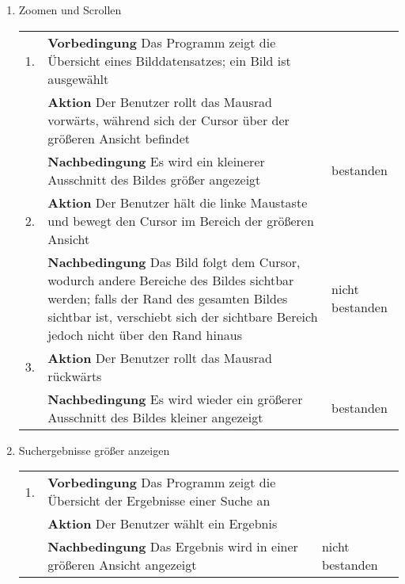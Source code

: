\begin{enumerate} [label=\bfseries /TSW \arabic*0/, leftmargin=*]
	\item Zoomen und Scrollen \label{ts:zoom_scroll} \newline \newline
	\begin{tabular}{rp{4in}|l}
	1. & \textbf{Vorbedingung} Das Programm zeigt die Übersicht eines Bilddatensatzes; ein Bild ist ausgewählt & \\
	   & \textbf{Aktion} Der Benutzer rollt das Mausrad vorwärts, während sich der Cursor über der größeren Ansicht befindet & \\
	   & \textbf{Nachbedingung} Es wird ein kleinerer Ausschnitt des Bildes größer angezeigt & bestanden \\
	\hline
	2. & \textbf{Aktion} Der Benutzer hält die linke Maustaste und bewegt den Cursor im Bereich der größeren Ansicht & \\
	   & \textbf{Nachbedingung} Das Bild folgt dem Cursor, wodurch andere Bereiche des Bildes sichtbar werden; falls der Rand des gesamten Bildes sichtbar ist, verschiebt sich der sichtbare Bereich jedoch nicht über den Rand hinaus & nicht bestanden \\
	\hline
	3. & \textbf{Aktion} Der Benutzer rollt das Mausrad rückwärts & \\
	   & \textbf{Nachbedingung} Es wird wieder ein größerer Ausschnitt des Bildes kleiner angezeigt & bestanden \\
	\end{tabular}
	\newline

	\item Suchergebnisse größer anzeigen \label{ts:groesseres_suchergebnis} \newline \newline
	\begin{tabular}{rp{4in}|l}
	1. & \textbf{Vorbedingung} Das Programm zeigt die Übersicht der Ergebnisse einer Suche an & \\
	   & \textbf{Aktion} Der Benutzer wählt ein Ergebnis & \\
	   & \textbf{Nachbedingung} Das Ergebnis wird in einer größeren Ansicht angezeigt & nicht bestanden \\
	\end{tabular}
	\pagebreak


\end{enumerate}
